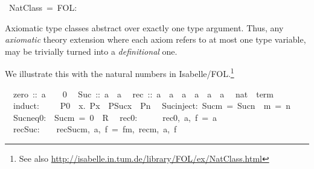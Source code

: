 \begin{isabelle}%
%
\ NatClass\ =\ FOL:%
\begin{isamarkuptext}%
\medskip\noindent Axiomatic type classes abstract over exactly one
 type argument. Thus, any \emph{axiomatic} theory extension where each
 axiom refers to at most one type variable, may be trivially turned
 into a \emph{definitional} one.

 We illustrate this with the natural numbers in
 Isabelle/FOL.\footnote{See also
 \url{http://isabelle.in.tum.de/library/FOL/ex/NatClass.html}}%
\end{isamarkuptext}%
\isanewline
\ \ zero\ ::\ {\isacharprime}a\ \ \ \ {\isacharparenleft}{\isachardoublequote}0{\isachardoublequote}{\isacharparenright}\isanewline
\ \ Suc\ ::\ {\isachardoublequote}{\isacharprime}a\ {\isasymRightarrow}\ {\isacharprime}a{\isachardoublequote}\isanewline
\ \ rec\ ::\ {\isachardoublequote}{\isacharprime}a\ {\isasymRightarrow}\ {\isacharprime}a\ {\isasymRightarrow}\ {\isacharparenleft}{\isacharprime}a\ {\isasymRightarrow}\ {\isacharprime}a\ {\isasymRightarrow}\ {\isacharprime}a{\isacharparenright}\ {\isasymRightarrow}\ {\isacharprime}a{\isachardoublequote}\isanewline
\isanewline
{}\isanewline
\ \ nat\ {\isacharless}\ {\isachardoublequote}term{\isachardoublequote}\isanewline
\ \ induct:\ \ \ \ \ {\isachardoublequote}P{\isacharparenleft}0{\isacharparenright}\ {\isasymLongrightarrow}\ {\isacharparenleft}{\isasymAnd}x.\ P{\isacharparenleft}x{\isacharparenright}\ {\isasymLongrightarrow}\ P{\isacharparenleft}Suc{\isacharparenleft}x{\isacharparenright}{\isacharparenright}{\isacharparenright}\ {\isasymLongrightarrow}\ P{\isacharparenleft}n{\isacharparenright}{\isachardoublequote}\isanewline
\ \ Suc{\isacharunderscore}inject:\ {\isachardoublequote}Suc{\isacharparenleft}m{\isacharparenright}\ =\ Suc{\isacharparenleft}n{\isacharparenright}\ {\isasymLongrightarrow}\ m\ =\ n{\isachardoublequote}\isanewline
\ \ Suc{\isacharunderscore}neq{\isacharunderscore}0:\ \ {\isachardoublequote}Suc{\isacharparenleft}m{\isacharparenright}\ =\ 0\ {\isasymLongrightarrow}\ R{\isachardoublequote}\isanewline
\ \ rec{\isacharunderscore}0:\ \ \ \ \ \ {\isachardoublequote}rec{\isacharparenleft}0,\ a,\ f{\isacharparenright}\ =\ a{\isachardoublequote}\isanewline
\ \ rec{\isacharunderscore}Suc:\ \ \ \ {\isachardoublequote}rec{\isacharparenleft}Suc{\isacharparenleft}m{\isacharparenright},\ a,\ f{\isacharparenright}\ =\ f{\isacharparenleft}m,\ rec{\isacharparenleft}m,\ a,\ f{\isacharparenright}{\isacharparenright}{\isachardoublequote}\isanewline

\end{isabelle}
